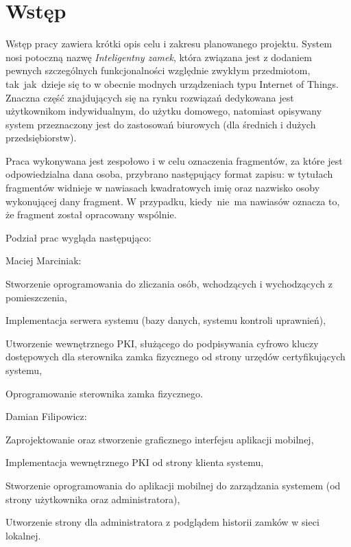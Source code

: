 \documentclass[twoside,10pt]{article}
\def\NazwaSys {\textit{Inteligentny zamek}}
\begin{document}
\newpage
\setcounter{page}{4}
\tableofcontents     %
\newpage\section{Wstęp}\label{sec:wstep}
Wstęp pracy zawiera krótki opis celu i zakresu planowanego projektu. System nosi potoczną nazwę \linebreak \NazwaSys, która związana jest z dodaniem  pewnych szczególnych funkcjonalności względnie zwykłym przedmiotom, tak~jak~dzieje się to w obecnie modnych urządzeniach\cite{porownanie zamkow} typu Internet of Things. Znaczna część znajdujących się na rynku rozwiązań dedykowana jest użytkownikom indywidualnym, do użytku domowego, natomiast opisywany system przeznaczony jest do zastosowań biurowych (dla średnich i dużych przedsiębiorstw).

Praca wykonywana jest zespołowo i w celu oznaczenia fragmentów, za które jest odpowiedzialna dana osoba, przybrano następujący format zapisu: w  tytułach fragmentów widnieje w nawiasach kwadratowych imię oraz nazwisko osoby wykonującej dany fragment. W przypadku, kiedy~nie~ma nawiasów oznacza to, że fragment został opracowany wspólnie.

Podział prac wygląda następująco:
\begin{itemize*}
\item Maciej Marciniak:
\begin{enumerate*}
\item Stworzenie oprogramowania do zliczania osób, wchodzących i wychodzących z pomieszczenia,
\item Implementacja serwera systemu (bazy danych, systemu kontroli uprawnień),
\item Utworzenie wewnętrznego PKI, służącego do podpisywania cyfrowo kluczy dostępowych dla sterownika zamka fizycznego od strony urzędów certyfikujących systemu,
\item Oprogramowanie sterownika zamka fizycznego.
\end{enumerate*}
\item Damian Filipowicz:
\begin{enumerate*}
\item Zaprojektowanie oraz stworzenie graficznego interfejsu aplikacji mobilnej,
\item Implementacja wewnętrznego PKI od strony klienta systemu,
\item Stworzenie oprogramowania do aplikacji mobilnej do zarządzania systemem (od strony użytkownika oraz administratora),
\item Utworzenie strony dla administratora z podglądem historii zamków w sieci lokalnej.
\end{enumerate*}
\end{itemize*}
\end{document}
